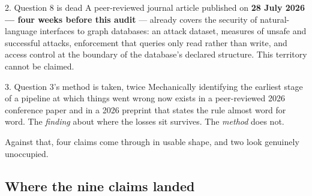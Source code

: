 \documentclass[11pt,a4paper]{article}
\begin{document}
\begin{alertbox}{2. Question 8 is dead}
A peer-reviewed journal article published on \textbf{28 July 2026 --- four weeks
before this audit} --- already covers the security of natural-language interfaces
to graph databases: an attack dataset, measures of unsafe and successful attacks,
enforcement that queries only read rather than write, and access control at the
boundary of the database's declared structure. This territory cannot be claimed.
\end{alertbox}

\begin{alertbox}{3. Question 3's method is taken, twice}
Mechanically identifying the earliest stage of a pipeline at which things went
wrong now exists in a peer-reviewed 2026 conference paper and in a 2026 preprint
that states the rule almost word for word. The \emph{finding} about where the
losses sit survives. The \emph{method} does not.
\end{alertbox}

Against that, four claims come through in usable shape, and two look genuinely
unoccupied.

\vspace{4mm}
\subsection*{Where the nine claims landed}

\begin{center}
\end{center}
\end{document}
